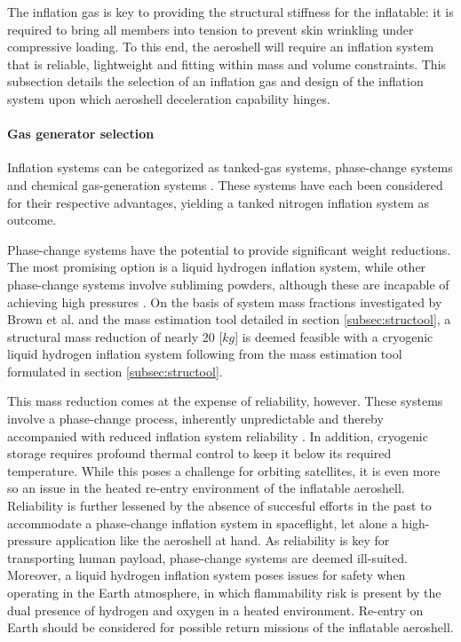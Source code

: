 The inflation gas is key to providing the structural stiffness for the inflatable: it is required to bring all members into tension to prevent skin wrinkling under compressive loading. To this end, the aeroshell will require an inflation system that is reliable, lightweight and fitting within mass and volume constraints. This subsection details the selection of an inflation gas and design of the inflation system upon which aeroshell deceleration capability hinges.

\paragraph{Gas generator selection}
Inflation systems can be categorized as tanked-gas systems, phase-change systems and chemical gas-generation systems \cite{Jenkins2001}. These systems have each been considered for their respective advantages, yielding a tanked nitrogen inflation system as outcome. 

Phase-change systems have the potential to provide significant weight reductions. The most promising option is a liquid hydrogen inflation system, while other phase-change systems involve subliming powders, although these are incapable of achieving high pressures \cite{Freeland1998}.  On the basis of system mass fractions investigated by Brown et al. \cite{Brown2009} and the mass estimation tool detailed in section \ref{subsec:structool}, a structural mass reduction of nearly 20 [$kg$] is deemed feasible with a cryogenic liquid hydrogen inflation system following from the mass estimation tool formulated in section \ref{subsec:structool}. 


This mass reduction comes at the expense of reliability, however. These systems involve a phase-change process, inherently unpredictable and thereby accompanied with reduced inflation system reliability \cite{Jenkins2001}. In addition, cryogenic storage requires profound thermal control to keep it below its required temperature. While this poses a challenge for orbiting satellites, it is even more so an issue in the heated re-entry environment of the inflatable aeroshell. Reliability is further lessened by the absence of succesful efforts in the past to accommodate a phase-change inflation system in spaceflight, let alone a high-pressure application like the aeroshell at hand. As reliability is key for transporting human payload, phase-change systems are deemed ill-suited. Moreover, a liquid hydrogen inflation system poses issues for safety when operating in the Earth atmosphere, in which flammability risk is present by the dual presence of hydrogen and oxygen in a heated environment. Re-entry on Earth should be considered for possible return missions of the inflatable aeroshell.


